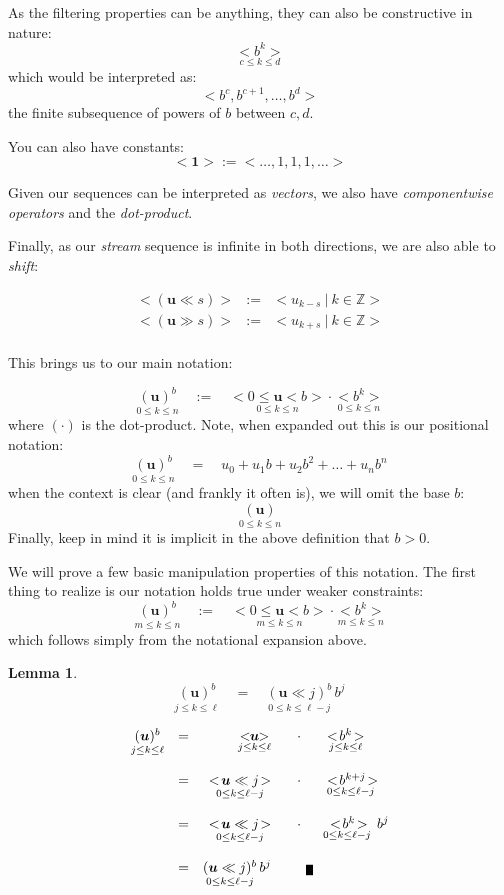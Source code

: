 \documentclass[twoside]{article}
\newcommand{\seq}[1][u]{\ensuremath{<\!#1\!>}}
\newcommand{\bseq}[1][u]{\ensuremath{<\!\!\bm{#1}\!\!>}}
\newcommand{\underseq}[2][u]{\ensuremath{\underset{#2}{<\!#1\!>}}}
\newcommand{\bunderseq}[2][u]{\ensuremath{\underset{#2}{<\!\!\bm{#1}\!\!>}}}
\newcommand{\radixp}[3][u]{\ensuremath{\underset{#2}{(#1)^{#3}}}}
\newcommand{\bradix}[2][u]{\ensuremath{\underset{#2}{(\bm{#1})}}}
\newcommand{\bradixp}[3][u]{\ensuremath{\underset{#2}{(\bm{#1})^{#3}}}}
\newtheorem{lemma}{Lemma}[section]
\newenvironment{proof}[1][Proof]{\begin{trivlist}
\item[\hskip \labelsep {\bfseries #1}]}{\end{trivlist}}
\newcommand{\qed}{\nobreak \ifvmode \relax \else
      \ifdim\lastskip<1.5em \hskip-\lastskip
      \hskip1.5em plus0em minus0.5em \fi \nobreak
      \vrule height0.5em width0.5em depth0.25em\fi}
\begin{document}
As the filtering properties can be anything, they can also be constructive in nature:
$$ \underset{c\le k\le d}{\seq[b^k]} $$
which would be interpreted as:
$$ <b^c,b^{c+1},\ldots,b^d> $$
the finite subsequence of powers of $ b $ between $ c,d $.

You can also have constants:
$$ \bseq[1]:=<\ldots,1,1,1,\ldots> $$

Given our sequences can be interpreted as \emph{vectors}, we also have \emph{componentwise operators} and the \emph{dot-product}.

Finally, as our \emph{stream} sequence is infinite in both directions, we are also able to \emph{shift}:

$$ \begin{array}{rcl}
\seq[(\bm{u}\ll s)] & := & <u_{k-s}\ |\ k\in\mathbb{Z}> \\
\seq[(\bm{u}\gg s)] & := & <u_{k+s}\ |\ k\in\mathbb{Z}> \\
\end{array} $$

\newpage

This brings us to our main notation:

$$ \bradixp{0\le k\le n}{b}\quad:=\quad\underseq[0\le\bm{u} < b]{0\le k\le n}\cdot\underseq[b^k]{0\le k\le n} $$
where $ (\cdot) $ is the dot-product. Note, when expanded out this is our positional notation:
$$ \bradixp{0\le k\le n}{b}\quad =\quad u_0+u_1b+u_2b^2+\ldots+u_nb^n $$
when the context is clear (and frankly it often is), we will omit the base $ b $:
$$ \bradix{0\le k\le n} $$
Finally, keep in mind it is implicit in the above definition that $ b > 0 $.

We will prove a few basic manipulation properties of this notation.
The first thing to realize is our notation holds true under weaker constraints:
$$ \bradixp{m\le k\le n}{b}\quad:=\quad\underseq[0\le\bm{u} < b]{m\le k\le n}\cdot\underseq[b^k]{m\le k\le n} $$
which follows simply from the notational expansion above.

\begin{lemma}
\color{blue}
$$ \bradixp{j\le k\le\ell}{b}\quad =\quad \radixp[\bm{u}\ll j]{\!\!0\le k\le\ell-j}{b}\, b^j $$
\end{lemma}

\begin{proof}
$$ \begin{array}{rrrcl}
\bradixp{j\le k\le\ell}{b}
	& = &	\bunderseq{j\le k\le\ell}		& \cdot & \underseq[b^k]{j\le k\le\ell}			\\
														\\
	& = &	\underseq[\bm{u}\ll j]{0\le k\le\ell-j} & \cdot & \underseq[b^{k+j}]{\!\!0\le k\le\ell-j}	\\
														\\
	& = &	\underseq[\bm{u}\ll j]{0\le k\le\ell-j} & \cdot & \underseq[b^k]{\!\!0\le k\le\ell-j}\, b^j	\\
														\\
	& = &	\radixp[\bm{u}\ll j]{0\le k\le\ell-j}{b}\, b^j	& \qed	\\
\end{array} $$
\end{proof}
\end{document}
